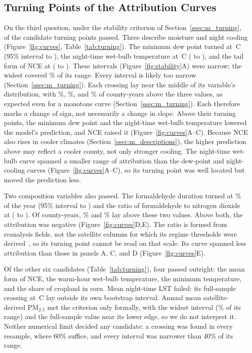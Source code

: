 \documentclass[sensors,article,submit,moreauthors,pdftex]{Definitions/mdpi}
\begin{document}
\subsection{Turning Points of the Attribution Curves}
\label{ssec:r_turning}
On the third question, under the stability criterion of
Section~\ref{ssec:m_turning}, \TpStable{} of the \TpTotal{} candidate turning points passed.
Three describe moisture and
night cooling (Figure~\ref{fig:curves}, Table~\ref{tab:turning}). The minimum dew point turned at \TpDew{}\,\textdegree C (95\%
interval \TpDewLo{} to \TpDewHi{}), the night-time wet-bulb temperature at
\TpWet{}\,\textdegree C (\TpWetLo{} to \TpWetHi{}), and the tail form of NCE at
\TpNce{} (\TpNceLo{} to \TpNceHi{}). These intervals
(Figure~\ref{fig:stability}A) were narrow; the widest covered
\TpTripletWidthMax{}\% of its range. Every interval is likely too narrow
(Section~\ref{ssec:m_turning}).
Each crossing lay near the middle of its
variable's distribution,
with \TpDewAbove{}\%, \TpWetAbove{}\%, and
\TpNceAbove{}\% of county-years above the three values, as expected even for a monotone curve (Section~\ref{ssec:m_turning}). Each therefore
marks a
change of sign, not necessarily a change in slope. Above their
turning points, the minimum dew point and the night-time wet-bulb temperature
lowered the model's prediction, and NCE raised it
(Figure~\ref{fig:curves}A--C). Because NCE also rises in cooler climates (Section~\ref{ssec:m_descriptions}), the
higher prediction above \TpNce{} may reflect a cooler county, not only stronger
cooling. The night-time wet-bulb curve spanned a smaller range of
attribution than the dew-point and night-cooling curves (Figure~\ref{fig:curves}A--C), so its turning point
was well located but moved the prediction less.

Two composition variables also passed. The formaldehyde duration turned at
\TpHcho{}\% of the year (95\% interval \TpHchoLo{} to \TpHchoHi{}) and the
ratio of formaldehyde to nitrogen dioxide at \TpRatio{} (\TpRatioLo{} to
\TpRatioHi{}). Of county-years, \TpHchoAbove{}\% and \TpRatioAbove{}\% lay
above these two values. Above both, the attribution was
negative (Figure~\ref{fig:curves}D,E). The ratio is formed from reanalysis
fields, not the satellite columns for which its regime thresholds were
derived~\cite{Duncan2010}, so its turning point cannot be read on that scale.
Its curve spanned less attribution than those in panels A, C, and D (Figure~\ref{fig:curves}E).

Of the other six candidates (Table~\ref{tab:turning}), four passed outright:
the mean form of
NCE, the warm-hour wet-bulb temperature, the minimum temperature, and
the share of cropland in corn. Mean night-time LST failed: its
full-sample crossing at \TpLst{}\,\textdegree C lay outside its own bootstrap
interval. Annual mean satellite-derived PM$_{2.5}$ met the criterion only
formally, with the
widest interval (\TpPmWidth{}\% of its range) and the full-sample value near
its lower edge, so we do not interpret it. Neither numerical limit decided any
candidate: a crossing was found in every resample, where 60\% suffice, and
every interval was narrower than 40\% of its range.
\end{document}

